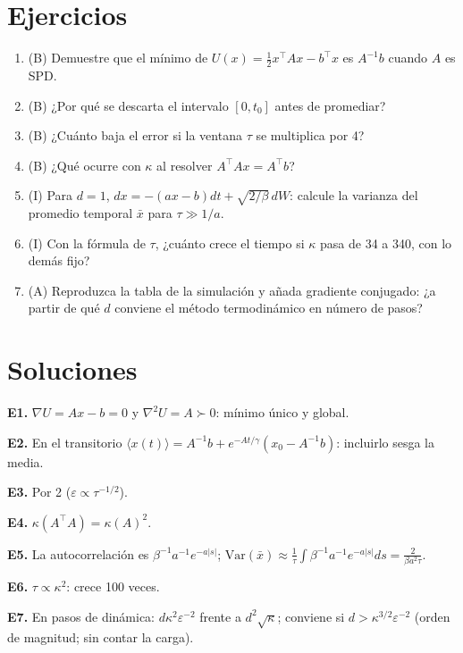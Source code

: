 \documentclass[11pt,a4paper]{article}
\begin{document}
\section{Ejercicios}
\begin{enumerate}[label=\textbf{E\arabic*.}]
\item (B) Demuestre que el mínimo de $U(x)=\tfrac12x^\top Ax-b^\top x$ es $A^{-1}b$ cuando $A$ es SPD.
\item (B) ¿Por qué se descarta el intervalo $[0,t_0]$ antes de promediar?
\item (B) ¿Cuánto baja el error si la ventana $\tau$ se multiplica por 4?
\item (B) ¿Qué ocurre con $\kappa$ al resolver $A^\top Ax=A^\top b$?
\item (I) Para $d=1$, $dx=-(ax-b)dt+\sqrt{2/\beta}\,dW$: calcule la varianza del promedio temporal $\bar x$ para $\tau\gg1/a$.
\item (I) Con la fórmula de $\tau$, ¿cuánto crece el tiempo si $\kappa$ pasa de 34 a 340, con lo demás fijo?
\item (A) Reproduzca la tabla de la simulación y añada gradiente conjugado: ¿a partir de qué $d$ conviene el método termodinámico en número de pasos?
\end{enumerate}
\section{Soluciones}
\begin{solucion}
\textbf{E1.} $\nabla U=Ax-b=0$ y $\nabla^2U=A\succ0$: mínimo único y global.

\textbf{E2.} En el transitorio $\langle x(t)\rangle=A^{-1}b+e^{-At/\gamma}(x_0-A^{-1}b)$: incluirlo sesga la media.

\textbf{E3.} Por 2 ($\varepsilon\propto\tau^{-1/2}$).

\textbf{E4.} $\kappa(A^\top A)=\kappa(A)^2$.

\textbf{E5.} La autocorrelación es $\beta^{-1}a^{-1}e^{-a|s|}$; $\mathrm{Var}(\bar x)\approx\frac1\tau\int\beta^{-1}a^{-1}e^{-a|s|}ds=\frac{2}{\beta a^2\tau}$.

\textbf{E6.} $\tau\propto\kappa^2$: crece 100 veces.

\textbf{E7.} En pasos de dinámica: $d\kappa^2\varepsilon^{-2}$ frente a $d^2\sqrt\kappa$; conviene si $d>\kappa^{3/2}\varepsilon^{-2}$ (orden de magnitud; sin contar la carga).
\end{solucion}
\end{document}
